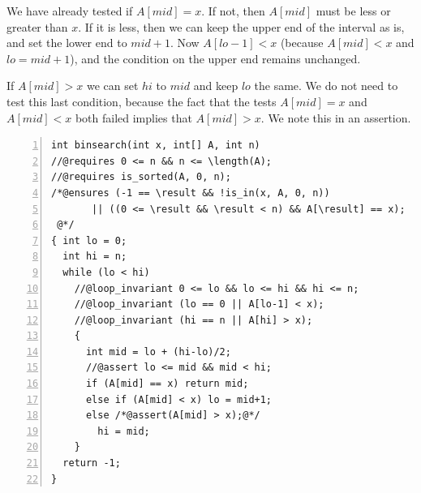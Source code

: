 We have already tested if $A[\mathit{mid}] = x$.  If not, then
$A[\mathit{mid}]$ must be less or greater than $x$.  If it is less,
then we can keep the upper end of the interval as is, and set the
lower end to $\mathit{mid}+1$.  Now $A[\mathit{lo}-1] < x$ (because
$A[\mathit{mid}] < x$ and $\mathit{lo} = \mathit{mid}+1$), and the
condition on the upper end remains unchanged.

If $A[\mathit{mid}] > x$ we can set $\mathit{hi}$ to $\mathit{mid}$
and keep $\mathit{lo}$ the same.  We do not need to test this last
condition, because the fact that the tests $A[\mathit{mid}] = x$ and
$A[\mathit{mid}] < x$ both failed implies that $A[\mathit{mid}] > x$.
We note this in an assertion.

\clearpage

\begin{lstlisting}[language={[C0]C}, numbers=left]
int binsearch(int x, int[] A, int n)
//@requires 0 <= n && n <= \length(A);
//@requires is_sorted(A, 0, n);
/*@ensures (-1 == \result && !is_in(x, A, 0, n))
       || ((0 <= \result && \result < n) && A[\result] == x);
 @*/
{ int lo = 0;
  int hi = n;
  while (lo < hi)
    //@loop_invariant 0 <= lo && lo <= hi && hi <= n;
    //@loop_invariant (lo == 0 || A[lo-1] < x);
    //@loop_invariant (hi == n || A[hi] > x);
    {
      int mid = lo + (hi-lo)/2;
      //@assert lo <= mid && mid < hi;
      if (A[mid] == x) return mid;
      else if (A[mid] < x) lo = mid+1;
      else /*@assert(A[mid] > x);@*/
        hi = mid;
    }
  return -1;
}
\end{lstlisting}

